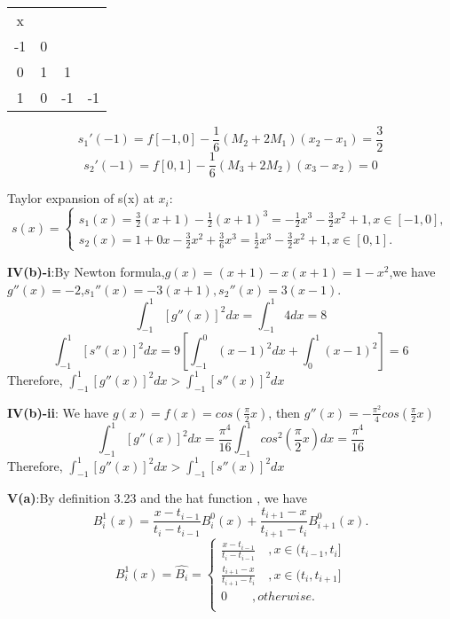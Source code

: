 \documentclass{article}
\begin{document}
\begin{tabular}{c|ccc }
x \\
-1 & 0 \\
0 & 1 & 1 \\
1 & 0 & -1 & -1 \\
\end{tabular}
\begin{equation*}
    s_1'(-1) = f[-1,0]-\frac{1}{6}(M_2 + 2M_1)(x_2 - x_1) = \frac{3}{2}
\end{equation*}
\begin{equation*}
    s_2'(-1) = f[0,1]-\frac{1}{6}(M_3+2M_2)(x_3-x_2) = 0
\end{equation*}

Taylor expansion of s(x) at $x_i$:
\begin{equation*}
    s(x)= 
    \begin{cases}
    s_1(x) = \frac{3}{2}(x+1) - \frac{1}{2}(x+1)^3 = -\frac{1}{2}x^3-\frac{3}{2}x^2 + 1 , x\in[-1,0], \\
    s_2(x) = 1 + 0x -\frac{3}{2}x^2 + \frac{3}{6}x^3 = \frac{1}{2}x^3-\frac{3}{2}x^2 + 1 , x\in[0,1].
    \end{cases}
\end{equation*}

\textbf{IV(b)-i}:By Newton formula,$g(x) = (x+1)-x(x+1) = 1-x^2$,we have $g''(x)=-2$,$s_1''(x)=-3(x+1), s_2''(x)=3(x-1)$.
\begin{equation*}
    \int_{-1}^{1}[g''(x)]^2 dx = \int_{-1}^{1}4 dx = 8
\end{equation*}
\begin{equation*}
    \int_{-1}^{1}[s''(x)]^2 dx = 9[\int_{-1}^{0}(x-1)^2 dx + \int_{0}^{1}(x-1)^2] = 6
\end{equation*}
Therefore, $\int_{-1}^{1}[g''(x)]^2 dx > \int_{-1}^{1}[s''(x)]^2 dx $

\textbf{IV(b)-ii}: We have $g(x)=f(x)=cos(\frac{\pi}{2}x)$, then $g''(x) = -\frac{\pi^2}{4}cos(\frac{\pi}{2}x)$
\begin{equation*}
    \int_{-1}^{1}[g''(x)]^2 dx = \frac{\pi^4}{16}\int_{-1}^{1} cos^2(\frac{\pi}{2}x) dx = \frac{\pi^4}{16}
\end{equation*}
Therefore, $\int_{-1}^{1}[g''(x)]^2 dx > \int_{-1}^{1}[s''(x)]^2 dx $

\textbf{V(a)}:By definition 3.23 and the hat function , we have 
\begin{equation*}
    B^{1}_{i}(x)=\frac{x-t_{i-1}}{t_i-t_{i-1}}B^{0}_{i} (x)+\frac{t_{i+1}-x}{t_{i+1}-t_i}B^{0}_{i+1}(x).
\end{equation*}     
\begin{equation*}
    B^{1}_{i}(x)= \hat{B_i} = 
    \begin{cases}
		\frac{x-t_{i-1}}{t_i-t_{i-1}} \quad,x\in(t_{i-1},t_i]\\
		\frac{t_{i+1}-x}{t_{i+1}-t_i} \quad,x\in(t_i,t_{i+1}]\\
		0 \qquad ,otherwise.\\
    \end{cases}
\end{equation*}
\end{document}
